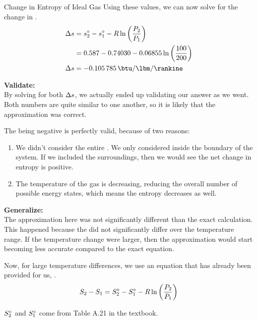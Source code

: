 \begin{example}{Change in Entropy of Ideal Gas}
  Using these values, we can now solve for the change in .
  \begin{align*}
    \Change{\SpecificEntropy} &= \SpecificEntropy_{2}^{\circ} - \SpecificEntropy_{1}^{\circ} - \GasConstant \ln \left( \frac{\Pressure_{2}}{\Pressure_{1}} \right) \\
                      &= 0.587 - 0.74030 - 0.06855 \ln \left( \frac{100}{200} \right) \\
    \Change{\SpecificEntropy} &= \SI{-0.105785}{\btu\per\lbm\per\rankine}
  \end{align*}

  \textbf{Validate:} \\
  By solving for both $\Delta s$, we actually ended up validating our answer as we went.
  Both numbers are quite similar to one another, so it is likely that the approximation was correct.

  The  being negative is perfectly valid, because of two reasons:
  \begin{enumerate}[noitemsep]
  \item We didn't consider the entire .
    We only considered inside the boundary of the system.
    If we included the surroundings, then we would see the net change in entropy is positive.
  \item The temperature of the gas is decreasing, reducing the overall number of possible energy states, which means the entropy decreases as well.
  \end{enumerate}

  \textbf{Generalize:} \\
  The approximation here was not significantly different than the exact calculation.
  This happened because the  did not significantly differ over the temperature range.
  If the temperature change were larger, then the approximation would start becoming less accurate compared to the exact equation.
\end{example}

Now, for large temperature differences, we use an equation that has already been provided for us, .
\begin{equation}\label{eq:Entropy_Change_Ideal_Gas-Large_Temp}
  S_{2} - S_{1} = S_{2}^{\circ} - S_{1}^{\circ} - R \ln \left( \frac{P_{2}}{P_{1}} \right)
\end{equation}
\begin{description}[noitemsep]
\item $S_{2}^{\circ}$ and $S_{1}^{\circ}$ come from Table A.21 in the textbook.
\end{description}

